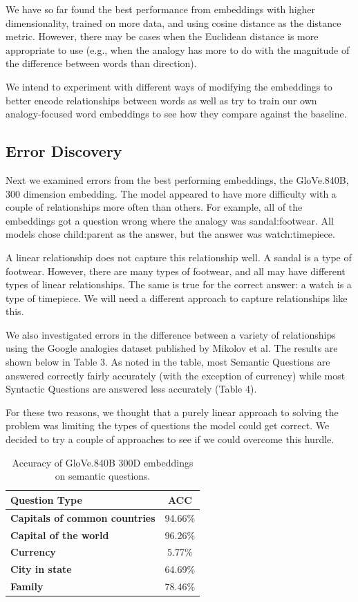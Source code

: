 \documentclass[11pt]{article}
\begin{document}
We have so far found the best performance from embeddings with higher
dimensionality, trained on more data, and using cosine distance as the
distance metric. However, there may be cases when the Euclidean distance
is more appropriate to use (e.g., when the analogy has more to do with
the magnitude of the difference between words than direction).

We intend to experiment with different ways of modifying the embeddings
to better encode relationships between words as well as try to train our
own analogy-focused word embeddings to see how they compare against the
baseline.

\subsection{Error Discovery}

Next we examined errors from the best performing embeddings, the GloVe.840B, 300
dimension embedding. The model appeared to have more difficulty with a couple of
relationships more often than others. For example, all of the embeddings got a
question wrong where the analogy was sandal:footwear. All models chose
child:parent as the answer, but the answer was watch:timepiece.

A linear relationship does not capture this relationship well. A sandal
is a type of footwear. However, there are many types of footwear, and
all may have different types of linear relationships. The same is true
for the correct answer: a watch is a type of timepiece. We will need a
different approach to capture relationships like this.

We also investigated errors in the difference between a variety of
relationships using the Google analogies dataset published by Mikolov et
al. The results are shown below in Table 3. As noted in the table, most
Semantic Questions are answered correctly fairly accurately (with the
exception of currency) while most Syntactic Questions are answered less
accurately (Table 4).

For these two reasons, we thought that a purely linear approach to
solving the problem was limiting the types of questions the model could
get correct. We decided to try a couple of approaches to see if we could
overcome this hurdle.


\begin{table}[h]
\begin{center}
\begin{tabular}{|l|c|}
\hline\bf Question Type & \bf ACC \\\hline
\bf Capitals of common countries & 94.66\% \\
\bf Capital of the world & 96.26\% \\
\bf Currency & 5.77\% \\
\bf City in state & 64.69\% \\
\bf Family & 78.46\% \\ \hline
\end{tabular}
\end{center}
\caption{\label{font-table} Accuracy of GloVe.840B 300D embeddings on semantic questions.}
\end{table}
\end{document}
